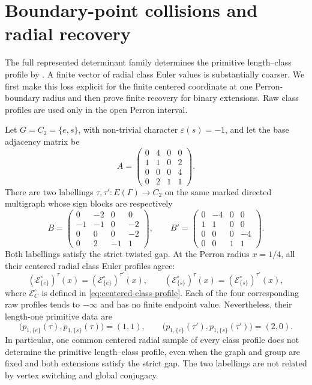\section{Boundary-point collisions and radial recovery}
\label{sec:boundary-collisions}

The full represented determinant family determines the primitive
length--class profile by .  A finite vector
of radial class Euler values is substantially coarser.  We first make this
loss explicit for the finite centered coordinate at one Perron-boundary
radius and then prove finite recovery for binary extensions.  Raw class
profiles are used only in the open Perron interval.

\begin{theorem}
\label{thm:c2-boundary-collision}
Let \(G=C_2=\{e,s\}\), with non-trivial character
\(\varepsilon(s)=-1\), and let the base adjacency matrix be
\[
 A=\begin{pmatrix}
 0&4&0&0\\
 1&1&0&2\\
 0&0&0&4\\
 0&2&1&1
 \end{pmatrix}.
\]
There are two labellings \(\tau,\tau':E(\Gamma)\to C_2\) on the same marked
directed multigraph whose sign blocks are respectively
\[
 B=\begin{pmatrix}
 0&-2&0&0\\
 -1&-1&0&-2\\
 0&0&0&-2\\
 0&2&-1&1
 \end{pmatrix},
 \qquad
 B'=\begin{pmatrix}
 0&-4&0&0\\
 1&1&0&0\\
 0&0&0&-4\\
 0&0&1&1
 \end{pmatrix}.
\]
Both labellings satisfy the strict twisted gap.  At the Perron radius
\(x=1/4\), all their centered radial class Euler profiles agree:
\begin{equation}\label{eq:c2-collision-constants}
 (\mathcal E_{\{e\}}^\circ)^\tau(x)
 =(\mathcal E_{\{e\}}^\circ)^{\tau'}(x),
 \qquad
 (\mathcal E_{\{s\}}^\circ)^\tau(x)
 =(\mathcal E_{\{s\}}^\circ)^{\tau'}(x),
\end{equation}
where \(\mathcal E_C^\circ\) is defined in
\eqref{eq:centered-class-profile}.  Each of the four corresponding raw
profiles tends to \(-\infty\) and has no finite endpoint value.
Nevertheless, their length-one primitive data are
\begin{equation}\label{eq:c2-collision-length-one}
 \bigl(p_{1,\{e\}}(\tau),p_{1,\{s\}}(\tau)\bigr)=(1,1),
 \qquad
 \bigl(p_{1,\{e\}}(\tau'),p_{1,\{s\}}(\tau')\bigr)=(2,0).
\end{equation}
In particular, one common centered radial sample of every class profile does not
determine the primitive length--class profile, even when the graph and group
are fixed and both extensions satisfy the strict gap.  The two labellings are
not related by vertex switching and global conjugacy.
\end{theorem}

